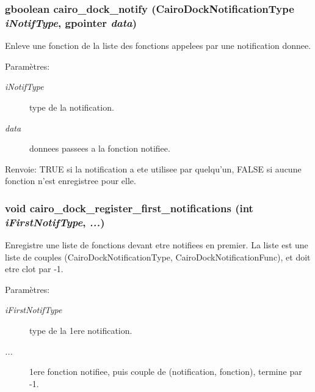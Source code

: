 \subsubsection{\setlength{\rightskip}{0pt plus 5cm}gboolean cairo\_\-dock\_\-notify ({\bf CairoDockNotificationType} {\em iNotifType}, gpointer {\em data})}\label{cairo-dock-notifications_8h_b384dab889291442b54ea600bb411ea3}


Enleve une fonction de la liste des fonctions appelees par une notification donnee. \begin{Desc}
\item[Paramètres:]
\begin{description}
\item[{\em iNotifType}]type de la notification. \item[{\em data}]donnees passees a la fonction notifiee. \end{description}
\end{Desc}
\begin{Desc}
\item[Renvoie:]TRUE si la notification a ete utilisee par quelqu'un, FALSE si aucune fonction n'est enregistree pour elle. \end{Desc}
\subsubsection{\setlength{\rightskip}{0pt plus 5cm}void cairo\_\-dock\_\-register\_\-first\_\-notifications (int {\em iFirstNotifType},  {\em ...})}\label{cairo-dock-notifications_8h_2f070bd652229d8ffef801ec27d64777}


Enregistre une liste de fonctions devant etre notifiees en premier. La liste est une liste de couples (CairoDockNotificationType, CairoDockNotificationFunc), et doit etre clot par -1. \begin{Desc}
\item[Paramètres:]
\begin{description}
\item[{\em iFirstNotifType}]type de la 1ere notification. \item[{\em ...}]1ere fonction notifiee, puis couple de (notification, fonction), termine par -1. \end{description}
\end{Desc}
